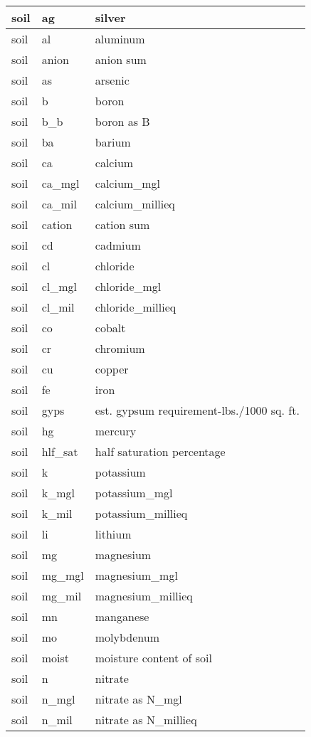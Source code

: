 \documentclass[
]{article}
\begin{document}
\begin{table}
\begin{tabular}[t]{l|l|l}
\hline
soil & ag & silver\\
\hline
soil & al & aluminum\\
\hline
soil & anion & anion sum\\
\hline
soil & as & arsenic\\
\hline
soil & b & boron\\
\hline
soil & b\_b & boron as B\\
\hline
soil & ba & barium\\
\hline
soil & ca & calcium\\
\hline
soil & ca\_mgl & calcium\_mgl\\
\hline
soil & ca\_mil & calcium\_millieq\\
\hline
soil & cation & cation sum\\
\hline
soil & cd & cadmium\\
\hline
soil & cl & chloride\\
\hline
soil & cl\_mgl & chloride\_mgl\\
\hline
soil & cl\_mil & chloride\_millieq\\
\hline
soil & co & cobalt\\
\hline
soil & cr & chromium\\
\hline
soil & cu & copper\\
\hline
soil & fe & iron\\
\hline
soil & gyps & est. gypsum requirement-lbs./1000 sq. ft.\\
\hline
soil & hg & mercury\\
\hline
soil & hlf\_sat & half saturation percentage\\
\hline
soil & k & potassium\\
\hline
soil & k\_mgl & potassium\_mgl\\
\hline
soil & k\_mil & potassium\_millieq\\
\hline
soil & li & lithium\\
\hline
soil & mg & magnesium\\
\hline
soil & mg\_mgl & magnesium\_mgl\\
\hline
soil & mg\_mil & magnesium\_millieq\\
\hline
soil & mn & manganese\\
\hline
soil & mo & molybdenum\\
\hline
soil & moist & moisture content of soil\\
\hline
soil & n & nitrate\\
\hline
soil & n\_mgl & nitrate as N\_mgl\\
\hline
soil & n\_mil & nitrate as N\_millieq\\

\end{tabular}
\end{table}
\end{document}
